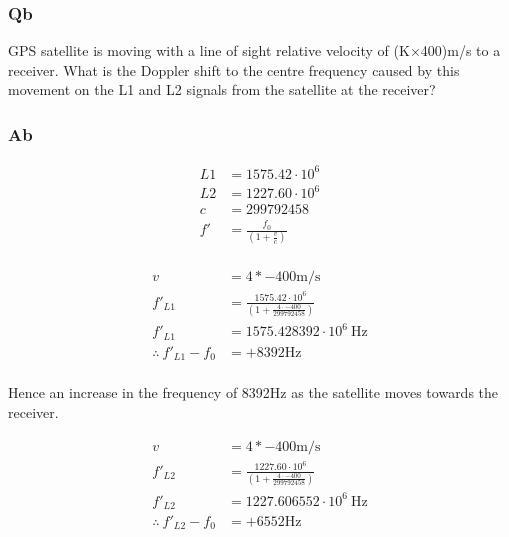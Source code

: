 \documentclass[11pt]{article}
\begin{document}
\subsubsection{Qb}
GPS satellite is moving with a line of sight relative velocity of (K×400)m/s to a receiver.  What is the Doppler shift to the centre frequency caused by this movement on the L1 and L2 signals from the satellite at the receiver?
\subsubsection{Ab}


\begin{equation}
    \begin{split}
        L1 &= 1575.42 \cdot 10^6\\
        L2 &= 1227.60 \cdot 10^6\\
        c &= 299 792 458\\
        f'&=\frac{f_{0}}{\left(1+\frac{v}{c}\right)}\\
    \end{split}
\end{equation}

\begin{equation}
    \begin{split}
        v &= 4*-400\text{m/s}\\
        f'_{L1} &=\frac{1575.42 \cdot 10^6}{\left(1+\frac{4\cdot-400}{299 792 458}\right)}\\
        f'_{L1} &= 1575.428392 \cdot 10^6\ \text{Hz}\\
        \therefore\ f'_{L1}-f_0 &= + 8392 \text{Hz}\\
    \end{split}
\end{equation}

Hence an increase in the frequency of 8392Hz as the satellite moves towards the receiver.

\begin{equation}
    \begin{split}
        v &= 4*-400\text{m/s}\\
        f'_{L2} &=\frac{1227.60 \cdot 10^6}{\left(1+\frac{4\cdot-400}{299 792 458}\right)}\\
        f'_{L2} &= 1227.606552 \cdot 10^6\ \text{Hz}\\
        \therefore\ f'_{L2}-f_0 &= + 6552 \text{Hz}\\
    \end{split}
\end{equation}
\end{document}
